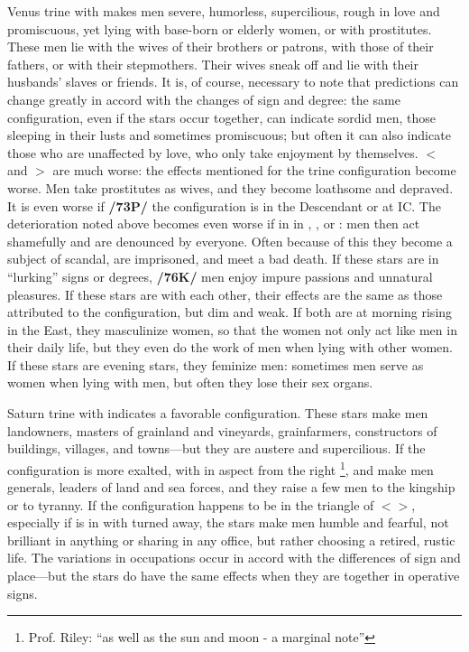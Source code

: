 Venus \marginnote{\Venus \Trine \Saturn} trine with \Saturn\xspace makes men severe, humorless, supercilious, rough in love and promiscuous, yet lying with base-born or elderly women, or with prostitutes. These men lie with the wives of their brothers or patrons, with those of their fathers, or with their stepmothers. Their wives sneak off and lie with their husbands’ slaves or friends. \mndl It is, of course, necessary to note that predictions can change greatly
in accord with the changes of sign and degree: the same configuration, even if the stars occur together, can
indicate sordid men, those sleeping in their lusts and sometimes promiscuous; but often it can also indicate
those who are unaffected by love, who only take enjoyment by themselves. $<$\Venus\xspace and \Saturn$>$ \Square\xspace are much worse: the effects mentioned for the trine configuration become worse. Men take prostitutes as wives, and they become loathsome and depraved. It is even worse if \textbf{/73P/} the configuration is in the Descendant or at IC. The deterioration noted above becomes even worse if \Mars\xspace in in \Conjunction, \Square, or \Opposition: men then act shamefully and are denounced by everyone. Often because of this they become a subject of scandal, are imprisoned, and meet a bad death. If these stars are in “lurking” signs or degrees,
\textbf{/76K/} men enjoy impure passions and unnatural pleasures. If these stars are \Sextile\xspace with each other, their effects are the same as those attributed to the \Trine\xspace configuration, but dim and weak. If both are at morning rising in the East, they masculinize women, so that the women not only act like men in their daily life, but
they even do the work of men when lying with other women. If these stars are evening stars, they feminize men: sometimes men serve as women when lying with men, but often they lose their sex organs.

Saturn \marginnote{\Saturn \Trine \Jupiter} trine with \Jupiter\xspace indicates a favorable configuration. These stars make men landowners, masters of grainland and vineyards, grainfarmers, constructors of buildings, villages, and towns—but they are austere and supercilious. If the configuration is more exalted, with \Mars\xspace in aspect from the right
\footnote{Prof. Riley: ``as well as the sun and moon - a marginal note''},
\Saturn\xspace and \Jupiter\xspace make men generals, leaders of land and sea forces, and they raise a few men to the
kingship or to tyranny. If the configuration happens to be in the triangle of \Saturn\xspace $<$\Gemini\xspace \Libra\xspace \Aquarius$>$, especially if \Jupiter\xspace is in \Aquarius\xspace with \Mars\xspace turned away, the stars make men humble and fearful, not brilliant in anything or sharing in any office, but rather choosing a retired, rustic life. \mndl The variations in occupations occur in accord with the differences of sign and place—but the stars do have the same effects when they are together in operative signs.

